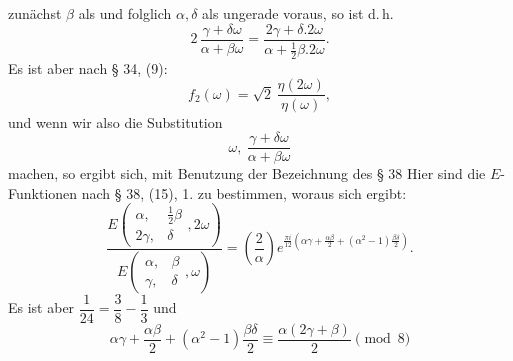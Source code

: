 zunächst $\beta$ als  und folglich $\alpha, \delta$ als ungerade voraus, so ist
d.\,h.
\[
2\,\frac{\gamma+\delta\omega}{\alpha+\beta\omega} = \frac{2\gamma+\delta.2\omega}{\alpha+\frac{1}{2}\beta.2\omega}.
\]
Es ist aber nach § 34, (9):
\[
f_2(\omega) = \sqrt{2}\,\frac{\eta(2\omega)}{\eta(\omega)},
\]
und wenn wir also die Substitution
\[
\omega,\ \frac{\gamma+\delta\omega}{\alpha+\beta\omega}
\]
machen, so ergibt sich, mit Benutzung der Bezeichnung des § 38
Hier sind die $E$-Funktionen nach § 38, (15), 1. zu bestimmen, woraus sich ergibt:
\[
\frac{E\!\left(\begin{smallmatrix}\alpha, & \frac{1}{2}\beta\\ 2\gamma, & \delta\end{smallmatrix}, 2\omega\right)}{E\!\left(\begin{smallmatrix}\alpha, & \beta\\ \gamma, & \delta\end{smallmatrix}, \omega\right)}
= \left(\frac{2}{\alpha}\right) e^{\frac{\pi i}{12}\left(\alpha\gamma + \frac{\alpha\beta}{2} + (\alpha^2-1)\frac{\beta\delta}{2}\right)}.
\]
Es ist aber $\dfrac{1}{24} = \dfrac{3}{8} - \dfrac{1}{3}$ und
\[
\alpha\gamma + \frac{\alpha\beta}{2} + (\alpha^2-1)\frac{\beta\delta}{2} \equiv \frac{\alpha(2\gamma+\beta)}{2} \pmod{8}
\]

